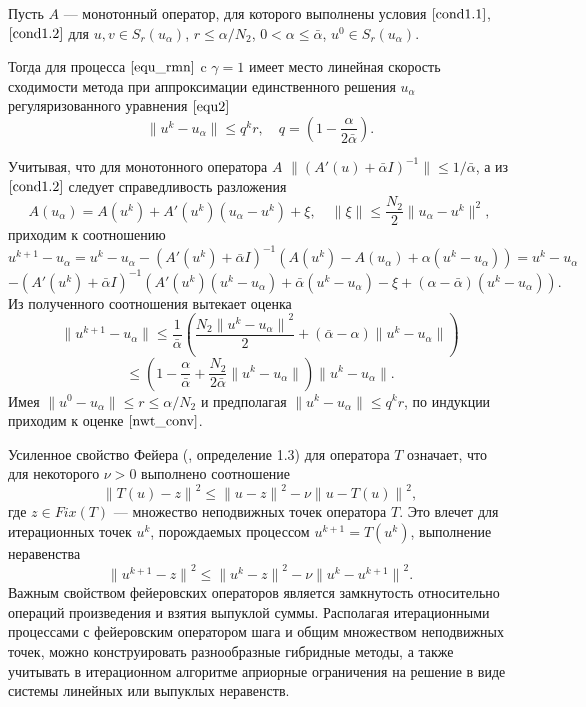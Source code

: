 \begin{theorem}\label{teo2.1} Пусть $A$ --- монотонный оператор, для которого выполнены условия $\eqref{cond1.1}$, $\eqref{cond1.2}$ для $u, v \in S_r(u_\alpha)$, $r\le \alpha/N_2$, $0<\alpha \le \bar\alpha$, $u^0 \in S_r(u_\alpha)$. 
	
	Тогда для процесса $\eqref{equ_rmn}$ c $\gamma=1$ имеет место линейная скорость сходимости метода при аппроксимации единственного решения $u_\alpha$ регуляризованного уравнения $\eqref{equ2}$
	\begin{equation}\label{nwt_conv}
	\| u^k-u_\alpha \| \le q^kr, \quad q=(1-\frac{\alpha}{2\bar\alpha}).
	\end{equation}
\end{theorem}
\proof 
Учитывая, что для монотонного оператора $A$ $\| (A'(u)+\bar\alpha I)^{-1} \| \le 1/\bar\alpha$, а из $\eqref{cond1.2}$ следует справедливость разложения
$$
A(u_\alpha)=A(u^k)+A'(u^k)(u_\alpha-u^k)+\xi, \quad \|\xi\|\le \frac{N_2}{2}\|u_\alpha-u^k\|^2,
$$
приходим к соотношению 
$$
u^{k+1}-u_\alpha=u^k-u_\alpha-(A'(u^k)+\bar\alpha I)^{-1}(A(u^k)-A(u_\alpha)+\alpha(u^k-u_\alpha))=u^k- u_\alpha$$ $$-(A'(u^k)+\bar\alpha I)^{-1}(A'(u^k)(u^k-u_\alpha)+\bar\alpha(u^k-u_\alpha)-\xi+(\alpha-\bar\alpha)(u^k-u_\alpha)). $$
Из полученного соотношения вытекает оценка
$$
\|u^{k+1}-u_\alpha\|\le\frac{1}{\bar\alpha}\left(\frac{N_2{\|u^{k}-u_\alpha\|}^2}{2}+(\bar\alpha-\alpha)\|u^k-u_\alpha\|\right)$$
$$\le\left(1-\frac{\alpha}{\bar\alpha}+\frac{N_2}{2\bar\alpha}\|u^k-u_\alpha\|\right)\|u^k-u_\alpha\|.$$
Имея $\|u^0-u_\alpha\|\le r \le \alpha/N_2$ и предполагая $\| u^{k}-u_\alpha \|\le q^kr$, по индукции приходим к оценке $\eqref{nwt_conv}$.

Усиленное свойство Фейера (\cite{VasEre2009}, определение 1.3) для оператора $T$ означает, что для некоторого $\nu>0$ выполнено соотношение
\begin{equation}\label{fejer_prop_uni}
{\|T(u)-z\|}^2\le{\|u-z\|}^2-\nu{\|u-T(u)\|}^2,
\end{equation}
где $z\in Fix(T)$ --- множество неподвижных точек оператора $T$. Это влечет для итерационных точек $u^k$, порождаемых процессом $u^{k+1}=T(u^k)$, выполнение неравенства
\begin{equation}\label{fejer_prop_it}
{\|u^{k+1}-z\|}^2\le{\|u^k-z\|}^2-\nu{\|u^k-u^{k+1}\|}^2.
\end{equation}
Важным свойством фейеровских операторов является замкнутость относительно операций произведения и взятия выпуклой суммы. Располагая итерационными процессами с фейеровским оператором шага и общим множеством неподвижных точек, можно конструировать разнообразные гибридные методы, а также учитывать в итерационном алгоритме априорные ограничения на решение в виде системы линейных или выпуклых неравенств.

